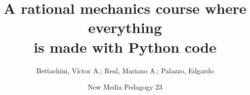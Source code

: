 \documentclass[aspectratio=169]{beamer}
\begin{document}
\title[A code centred mechanics subject]{A rational mechanics course where everything\\is made with Python code}
\author[vbettachini@unlam.edu.ar]{Bettachini, Víctor A.; Real, Mariano A.; Palazzo, Edgardo}
\date[2023-11-23]{
	New Media Pedagogy 23
}


\begin{frame} 
  \titlepage
\end{frame}

\end{document}

